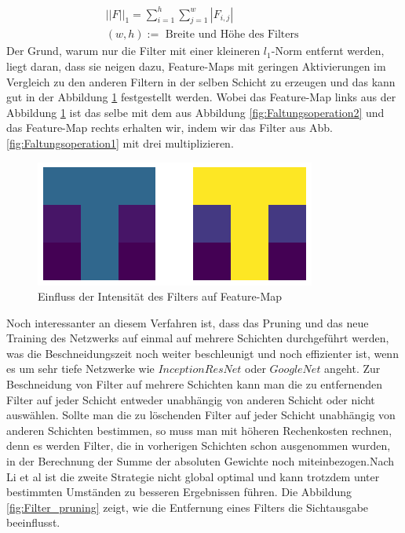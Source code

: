 \documentclass[12pt,a4paper]{scrartcl}
\numberwithin{equation}{section}
\begin{document}
\begin{itemize}
		\begin{equation}\label{eq:l_1}
			\begin{array}{c}		
			{||F||}_1 = \sum_{i =1}^{h}\sum_{j = 1}^{w}{|F_{i,j}|}\\
				(w, h) :=\text{ Breite und Höhe des Filters }
			\end{array}
		\end{equation}
		Der Grund, warum nur die Filter mit einer kleineren $ l_1 $-Norm entfernt werden, liegt daran, dass sie neigen dazu, Feature-Maps mit geringen Aktivierungen im Vergleich zu den anderen Filtern in der selben Schicht zu erzeugen und das kann gut in der Abbildung \ref{fig:Filter_Intensität} festgestellt werden. Wobei das Feature-Map links aus der Abbildung \ref{fig:Filter_Intensität} ist das selbe mit dem aus Abbildung \ref{fig:Faltungsoperation2} und das Feature-Map rechts erhalten wir, indem wir das Filter aus Abb. \ref{fig:Faltungsoperation1} mit drei multiplizieren.
	
		\begin{figure}[h]
			\centering
				
			\includegraphics[scale=.75]{Filter_intensite}
			\caption{Einfluss der Intensität des Filters auf Feature-Map}
			\label{fig:Filter_Intensität}
		\end{figure}
		Noch interessanter an diesem Verfahren ist, dass das Pruning und das neue Training des Netzwerks auf einmal auf mehrere Schichten durchgeführt werden, was die Beschneidungszeit noch weiter beschleunigt  und noch effizienter ist, wenn es um sehr tiefe Netzwerke wie $ InceptionResNet $ oder $ GoogleNet $ angeht. Zur Beschneidung von Filter auf mehrere Schichten kann man die zu entfernenden Filter auf jeder Schicht entweder unabhängig von anderen Schicht oder nicht auswählen. Sollte man die zu löschenden Filter auf jeder Schicht unabhängig von anderen Schichten bestimmen, so muss man mit höheren Rechenkosten rechnen, denn es werden Filter, die in vorherigen Schichten schon ausgenommen wurden, in der Berechnung der Summe der absoluten Gewichte noch miteinbezogen.Nach Li et al \cite{Filter Pruning} ist die zweite Strategie nicht global optimal und kann trotzdem unter bestimmten Umständen zu besseren Ergebnissen führen. Die Abbildung \ref{fig:Filter_pruning} zeigt, wie die Entfernung eines Filters die Sichtausgabe beeinflusst.
		\begin{figure}[h]
			\centering
			

\end{figure}
\end{itemize}
\end{document}
